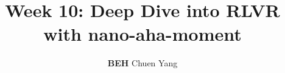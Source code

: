 \documentclass{article} %
\title{Week 10: Deep Dive into RLVR with nano-aha-moment}
\author{\textbf{BEH} Chuen Yang}
\theoremstyle{definition}
\begin{document}
\ifcolmsubmission
\linenumbers
\fi

\maketitle


\end{document}
